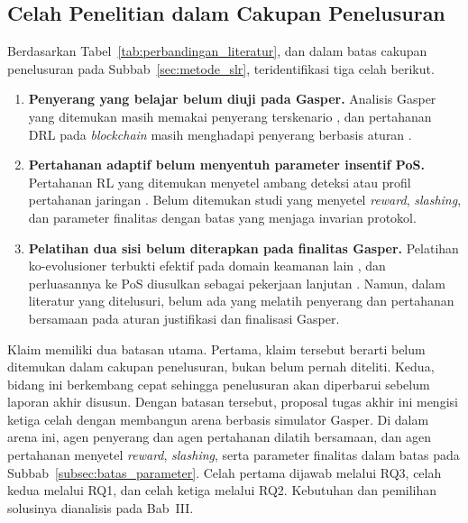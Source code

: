 \subsection{Celah Penelitian dalam Cakupan Penelusuran}
\label{subsec:celah}
Berdasarkan Tabel~\ref{tab:perbandingan_literatur}, dan dalam batas cakupan penelusuran pada Subbab~\ref{sec:metode_slr}, teridentifikasi tiga celah berikut.
\begin{enumerate}
	\item \textbf{Penyerang yang belajar belum diuji pada Gasper.} Analisis Gasper yang ditemukan masih memakai penyerang terskenario \parencite{laneve2025stochastic}, dan pertahanan DRL pada \textit{blockchain} masih menghadapi penyerang berbasis aturan \parencite{skowronski2026adaptive}.
	\item \textbf{Pertahanan adaptif belum menyentuh parameter insentif PoS.} Pertahanan RL yang ditemukan menyetel ambang deteksi \parencite{skowronski2026adaptive} atau profil pertahanan jaringan \parencite{wushishi2026coadam}. Belum ditemukan studi yang menyetel \textit{reward}, \textit{slashing}, dan parameter finalitas dengan batas yang menjaga invarian protokol.
	\item \textbf{Pelatihan dua sisi belum diterapkan pada finalitas Gasper.} Pelatihan ko-evolusioner terbukti efektif pada domain keamanan lain \parencite{wushishi2026coadam}, dan perluasannya ke PoS diusulkan sebagai pekerjaan lanjutan \parencite{skowronski2026adaptive}. Namun, dalam literatur yang ditelusuri, belum ada yang melatih penyerang dan pertahanan bersamaan pada aturan justifikasi dan finalisasi Gasper.
\end{enumerate}

Klaim memiliki dua batasan utama. Pertama, klaim tersebut berarti belum ditemukan dalam cakupan penelusuran, bukan belum pernah diteliti. Kedua, bidang ini berkembang cepat sehingga penelusuran akan diperbarui sebelum laporan akhir disusun. Dengan batasan tersebut, proposal tugas akhir ini mengisi ketiga celah dengan membangun arena berbasis simulator Gasper. Di dalam arena ini, agen penyerang dan agen pertahanan dilatih bersamaan, dan agen pertahanan menyetel \textit{reward}, \textit{slashing}, serta parameter finalitas dalam batas pada Subbab~\ref{subsec:batas_parameter}. Celah pertama dijawab melalui RQ3, celah kedua melalui RQ1, dan celah ketiga melalui RQ2. Kebutuhan dan pemilihan solusinya dianalisis pada Bab~III.